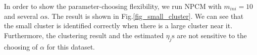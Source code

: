 \documentclass[conference]{IEEEtran}
\theoremstyle{definition}
\begin{document}
In order to show the parameter-choosing flexibility, we run NPCM with $m_{ini}=10$ and several $\alpha\text{s}$. The result is shown in Fig.\ref{fig_small_cluster}.
We can see that the small cluster is identified correctly when there is a large cluster near it. Furthermore, the clustering result and the estimated $\eta_j\text{s}$ are not sensitive to the choosing of $\alpha$ for this dataset. 
\begin{figure}[tb]
\captionsetup[subfloat]{farskip=1pt,captionskip=1pt}%
   \centering
   \quad
    \\
    \subfloat[]

\end{figure}
\end{document}
